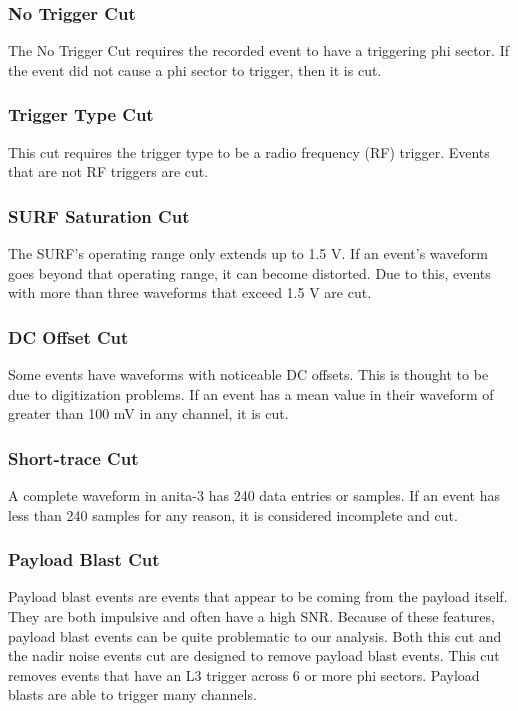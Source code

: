 \subsubsection{No Trigger Cut}

The No Trigger Cut requires the recorded event to have a triggering phi sector.  If the event did not cause a phi sector to trigger, then it is cut.

\subsubsection{Trigger Type Cut}

This cut requires the trigger type to be a radio frequency (RF) trigger.   Events that are not RF triggers are cut.
 
\subsubsection{SURF Saturation Cut}

The SURF's operating range only extends up to 1.5 V.  If an event's waveform goes beyond that operating range, it can become distorted.  Due to this, events with more than three waveforms that exceed 1.5 V are cut.

\subsubsection{DC Offset Cut}

Some events have waveforms with noticeable DC offsets.  This is thought to be due to digitization problems.  If an event has a mean value in their waveform of greater than 100 mV in any channel, it is cut.  

\subsubsection{Short-trace Cut}

A complete waveform in \gls{anita}-3 has 240 data entries or samples.  If an event has less than 240 samples for any reason, it is considered incomplete and cut.

\subsubsection{Payload Blast Cut}

Payload blast events are events that appear to be coming from the payload itself.  They are both impulsive and often have a high SNR. Because of these features, payload blast events can be quite problematic to our analysis.  Both this cut and the nadir noise events cut are designed to remove payload blast events.  This cut removes events that have an L3 trigger across 6 or more phi sectors.  Payload blasts are able to trigger many channels.  

